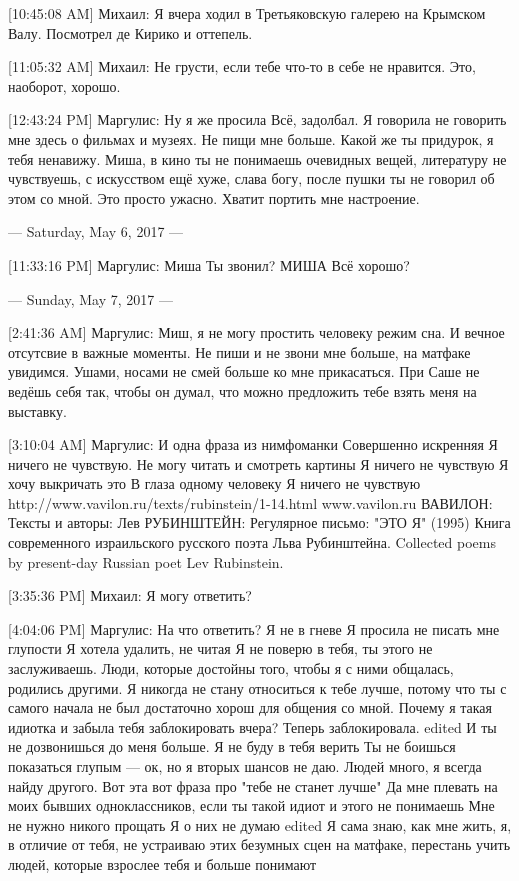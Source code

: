 \documentclass{article}
\begin{document}
[10:45:08 AM] Михаил:
Я вчера ходил в Третьяковскую галерею на Крымском Валу. Посмотрел де Кирико и оттепель.

[11:05:32 AM] Михаил:
Не грусти, если тебе что-то в себе не нравится.
 Это, наоборот, хорошо.

[12:43:24 PM] Маргулис:
Ну я же просила
 Всё, задолбал.
 Я говорила не говорить мне здесь о фильмах и музеях.
 Не пищи мне больше.
 Какой же ты придурок, я тебя ненавижу.
 Миша, в кино ты не понимаешь очевидных вещей, литературу не чувствуешь, с искусством ещё хуже, слава богу, после пушки ты не говорил об этом со мной. Это просто ужасно. Хватит портить мне настроение.

--- Saturday, May 6, 2017 ---

[11:33:16 PM] Маргулис:
Миша
 Ты звонил?
 МИША
 Всё хорошо?

--- Sunday, May 7, 2017 ---

[2:41:36 AM] Маргулис:
Миш, я не могу простить человеку режим сна. И вечное отсутсвие в важные моменты. Не пиши и не звони мне больше, на матфаке увидимся. Ушами, носами не смей больше ко мне прикасаться. При Саше не ведёшь себя так, чтобы он думал, что можно предложить тебе взять меня на выставку.

[3:10:04 AM] Маргулис:
И одна фраза из нимфоманки
 Совершенно искренняя
 Я ничего не чувствую.
 Не могу читать и смотреть картины
 Я ничего не чувствую
 Я хочу выкричать это
 В глаза одному человеку
 Я ничего не чувствую
 http://www.vavilon.ru/texts/rubinstein/1-14.html
www.vavilon.ru
ВАВИЛОН: Тексты и авторы: Лев РУБИНШТЕЙН: Регулярное письмо: "ЭТО Я" (1995)
Книга современного израильского русского поэта Льва Рубинштейна. Collected poems by present-day Russian poet Lev Rubinstein.

[3:35:36 PM] Михаил:
Я могу ответить?

[4:04:06 PM] Маргулис:
На что ответить?
 Я не в гневе
 Я просила не писать мне глупости
 Я хотела удалить, не читая
 Я не поверю в тебя, ты этого не заслуживаешь. Люди, которые достойны того, чтобы я с ними общалась, родились другими. Я никогда не стану относиться к тебе лучше, потому что ты с самого начала не был достаточно хорош для общения со мной.
 Почему я такая идиотка и забыла тебя заблокировать вчера?
 Теперь заблокировала.
edited 
И ты не дозвонишься до меня больше.
 Я не буду в тебя верить
 Ты не боишься показаться глупым — ок, но я вторых шансов не даю. Людей много, я всегда найду другого.
 Вот эта вот фраза про "тебе не станет лучше"
 Да мне плевать на моих бывших одноклассников, если ты такой идиот и этого не понимаешь
 Мне не нужно никого прощать
 Я о них не думаю
edited 
Я сама знаю, как мне жить, я, в отличие от тебя, не устраиваю этих безумных сцен на матфаке, перестань учить людей, которые взрослее тебя и больше понимают
\end{document}
